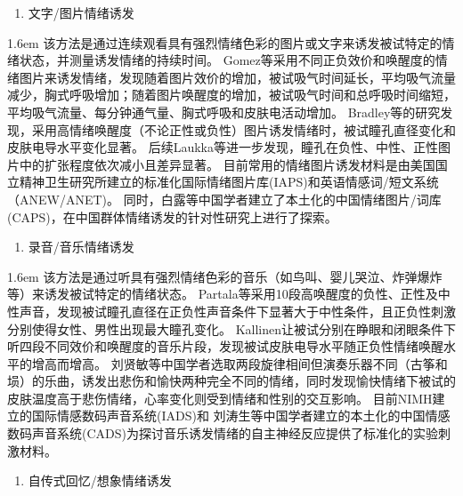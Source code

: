 \begin{enumerate}[\qquad(2)]
    \item 文字/图片情绪诱发
\end{enumerate}
    
\hangindent 1.6em
该方法是通过连续观看具有强烈情绪色彩的图片或文字来诱发被试特定的情绪状态，并测量诱发情绪的持续时间。
Gomez等\cite{Gomez2004}采用不同正负效价和唤醒度的情绪图片来诱发情绪，发现随着图片效价的增加，被试吸气时间延长，平均吸气流量减少，胸式呼吸增加；随着图片唤醒度的增加，被试吸气时间和总呼吸时间缩短，平均吸气流量、每分钟通气量、胸式呼吸和皮肤电活动增加。
Bradley等\cite{Bradley2008}的研究发现，采用高情绪唤醒度（不论正性或负性）图片诱发情绪时，被试瞳孔直径变化和皮肤电导水平变化显著。
后续Laukka等\cite{Laukka2013}进一步发现，瞳孔在负性、中性、正性图片中的扩张程度依次减小且差异显著。
目前常用的情绪图片诱发材料是由美国国立精神卫生研究所建立的标准化国际情绪图片库(IAPS)和英语情感词/短文系统（ANEW/ANET)。
同时，白露等中国学者\cite{BaiLu2005}建立了本土化的中国情绪图片/词库 (CAPS)，在中国群体情绪诱发的针对性研究上进行了探索。

\begin{enumerate}[\qquad(3)]
    \item 录音/音乐情绪诱发
\end{enumerate}
    
\hangindent 1.6em
该方法是通过听具有强烈情绪色彩的音乐（如鸟叫、婴儿哭泣、炸弹爆炸等）来诱发被试特定的情绪状态。
Partala等\cite{Partala2003}采用10段高唤醒度的负性、正性及中性声音，发现被试瞳孔直径在正负性声音条件下显著大于中性条件，且正负性刺激分别使得女性、男性出现最大瞳孔变化。
Kallinen\cite{Kallinen2004}让被试分别在睁眼和闭眼条件下听四段不同效价和唤醒度的音乐片段，发现被试皮肤电导水平随正负性情绪唤醒水平的增高而增高。
刘贤敏等中国学者\cite{LiuXianmin2011}选取两段旋律相间但演奏乐器不同（古筝和埙）的乐曲，诱发出悲伤和愉快两种完全不同的情绪，同时发现愉快情绪下被试的皮肤温度高于悲伤情绪，心率变化则受到情绪和性别的交互影响。
目前NIMH建立的国际情感数码声音系统(IADS)和
刘涛生等中国学者\cite{LiuTaosheng2006}建立的本土化的中国情感数码声音系统(CADS)为探讨音乐诱发情绪的自主神经反应提供了标准化的实验刺激材料。

\begin{enumerate}[\qquad(4)]
    \item 自传式回忆/想象情绪诱发
\end{enumerate}

